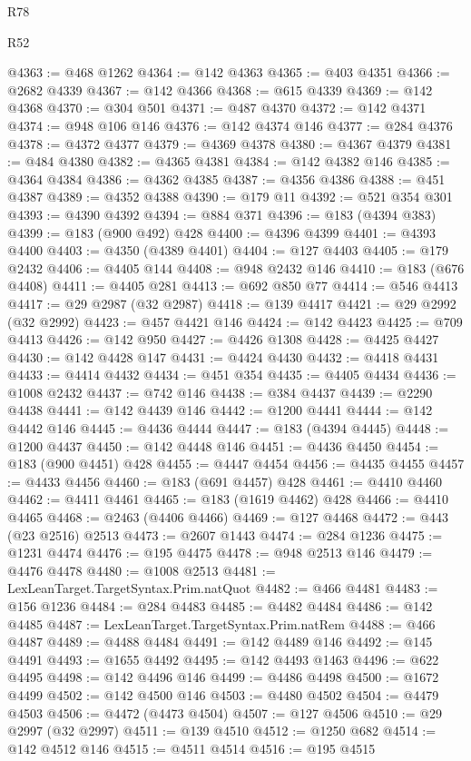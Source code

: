 \begin{lexlean}{R78}
\begin{lexlean}{R52}
\begin{coremodule}
{{{{{{{{{{{{{{{{{{{{{{{{{{{{{{{{{{{{{{{{{{{{{{{{{{{{{{{{{{{{{{{{{{{{{{{{{{{{{{{{{{{{{{{{{{{{{{{{{{{{{{{{{{{{{{{{{{{{{{{{{{{{{{{{{{{{{{{{{{{{{{{{{{{{{{{{{{{{{{{{{{{{{{{{{{{{{{{{{{{{{{{{{{{{{{{{{{{{{{@4363 := @468 @1262
@4364 := @142 @4363
@4365 := @403 @4351
@4366 := @2682 @4339
@4367 := @142 @4366
@4368 := @615 @4339
@4369 := @142 @4368
@4370 := @304 @501
@4371 := @487 @4370
@4372 := @142 @4371
@4374 := @948 @106 @146
@4376 := @142 @4374 @146
@4377 := @284 @4376
@4378 := @4372 @4377
@4379 := @4369 @4378
@4380 := @4367 @4379
@4381 := @484 @4380
@4382 := @4365 @4381
@4384 := @142 @4382 @146
@4385 := @4364 @4384
@4386 := @4362 @4385
@4387 := @4356 @4386
@4388 := @451 @4387
@4389 := @4352 @4388
@4390 := @179 @11
@4392 := @521 @354 @301
@4393 := @4390 @4392
@4394 := @884 @371
@4396 := @183 (@4394 @383)
@4399 := @183 (@900 @492) @428
@4400 := @4396 @4399
@4401 := @4393 @4400
@4403 := @4350 (@4389 @4401)
@4404 := @127 @4403
@4405 := @179 @2432
@4406 := @4405 @144
@4408 := @948 @2432 @146
@4410 := @183 (@676 @4408)
@4411 := @4405 @281
@4413 := @692 @850 @77
@4414 := @546 @4413
@4417 := @29 @2987 (@32 @2987)
@4418 := @139 @4417
@4421 := @29 @2992 (@32 @2992)
@4423 := @457 @4421 @146
@4424 := @142 @4423
@4425 := @709 @4413
@4426 := @142 @950
@4427 := @4426 @1308
@4428 := @4425 @4427
@4430 := @142 @4428 @147
@4431 := @4424 @4430
@4432 := @4418 @4431
@4433 := @4414 @4432
@4434 := @451 @354
@4435 := @4405 @4434
@4436 := @1008 @2432
@4437 := @742 @146
@4438 := @384 @4437
@4439 := @2290 @4438
@4441 := @142 @4439 @146
@4442 := @1200 @4441
@4444 := @142 @4442 @146
@4445 := @4436 @4444
@4447 := @183 (@4394 @4445)
@4448 := @1200 @4437
@4450 := @142 @4448 @146
@4451 := @4436 @4450
@4454 := @183 (@900 @4451) @428
@4455 := @4447 @4454
@4456 := @4435 @4455
@4457 := @4433 @4456
@4460 := @183 (@691 @4457) @428
@4461 := @4410 @4460
@4462 := @4411 @4461
@4465 := @183 (@1619 @4462) @428
@4466 := @4410 @4465
@4468 := @2463 (@4406 @4466)
@4469 := @127 @4468
@4472 := @443 (@23 @2516) @2513
@4473 := @2607 @1443
@4474 := @284 @1236
@4475 := @1231 @4474
@4476 := @195 @4475
@4478 := @948 @2513 @146
@4479 := @4476 @4478
@4480 := @1008 @2513
@4481 := LexLeanTarget.TargetSyntax.Prim.natQuot
@4482 := @466 @4481
@4483 := @156 @1236
@4484 := @284 @4483
@4485 := @4482 @4484
@4486 := @142 @4485
@4487 := LexLeanTarget.TargetSyntax.Prim.natRem
@4488 := @466 @4487
@4489 := @4488 @4484
@4491 := @142 @4489 @146
@4492 := @145 @4491
@4493 := @1655 @4492
@4495 := @142 @4493 @1463
@4496 := @622 @4495
@4498 := @142 @4496 @146
@4499 := @4486 @4498
@4500 := @1672 @4499
@4502 := @142 @4500 @146
@4503 := @4480 @4502
@4504 := @4479 @4503
@4506 := @4472 (@4473 @4504)
@4507 := @127 @4506
@4510 := @29 @2997 (@32 @2997)
@4511 := @139 @4510
@4512 := @1250 @682
@4514 := @142 @4512 @146
@4515 := @4511 @4514
@4516 := @195 @4515
}}}}}}}}}}}}}}}}}}}}}}}}}}}}}}}}}}}}}}}}}}}}}}}}}}}}}}}}}}}}}}}}}}}}}}}}}}}}}}}}}}}}}}}}}}}}}}}}}}}}}}}}}}}}}}}}}}}}}}}}}}}}}}}}}}}}}}}}}}}}}}}}}}}}}}}}}}}}}}}}}}}}}}}}}}}}}}}}}}}}}}}}}}}}}}}}}}}}}}
\end{coremodule}
\end{lexlean}
\end{lexlean}
